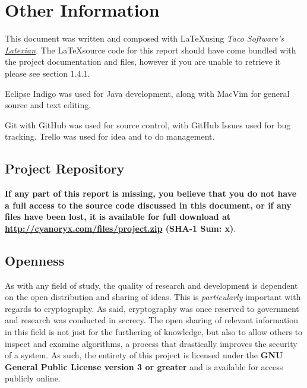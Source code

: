 \section{Other Information}

This document was written and composed with \LaTeX using \emph{Taco Software's \href{http://tacosw.com/latexian/}{Latexian}}. The \LaTeX source code for this report should have come bundled with the project documentation and files, however if you are unable to retrieve it please see section 1.4.1.

Eclipse Indigo was used for Java development, along with MacVim for general source and text editing.

Git with GitHub was used for source control, with GitHub Issues used for bug tracking. Trello was used for idea and to do management.

\subsection{Project Repository} \label{sec:repo}

\textbf{If any part of this report is missing, you believe that you do not have a full access to the source code discussed in this document, or if any files have been lost, it is available for full download at \url{http://cyanoryx.com/files/project.zip} (SHA-1 Sum: x)}. 

\subsection{Openness}

As with any field of study, the quality of research and development is dependent on the open distribution and sharing of ideas. This is \emph{particularly} important with regards to cryptography. As said, cryptography was once reserved to government and research was conducted in secrecy. The open sharing of relevant information in this field is not just for the furthering of knowledge, but also to allow others to inspect and examine algorithms, a process that drastically improves the security of a system. As such, the entirety of this project is licensed under the \textbf{GNU General Public License version 3 or greater} and is available for access publicly online.